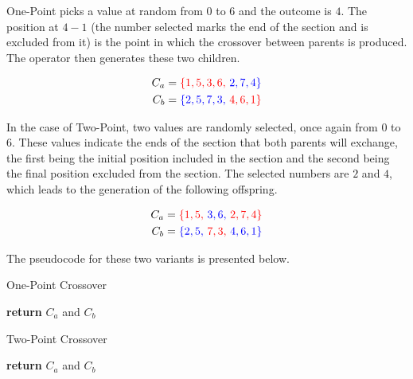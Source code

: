 One-Point picks a value at random from $0$ to $6$ and the outcome is $4$. The position at $4 - 1$ (the number selected marks the end of the section and is excluded from it) is the point in which the crossover between parents is produced. The operator then generates these two children.

\begin{align}
    C_{a} &= \color{red}{ \{ 1, 5, 3, 6,\ } \color{blue}{2, 7, 4} \}\\
    C_{b} &= \color{blue}{ \{ 2, 5, 7, 3,\ } \color{red}{4, 6, 1} \}
\end{align}

In the case of Two-Point, two values are randomly selected, once again from $0$ to $6$. These values indicate the ends of the section that both parents will exchange, the first being the initial position included in the section and the second being the final position excluded from the section. The selected numbers are $2$ and $4$, which leads to the generation of the following offspring.

\begin{align}
    C_{a} &= \color{red}{ \{ 1, 5,\ } \color{blue}{3, 6,\ } \color{red}{2, 7, 4} \}\\
    C_{b} &= \color{blue}{ \{ 2, 5,\ } \color{red}{7, 3,\ } \color{blue}{4, 6, 1} \}
\end{align}

The pseudocode for these two variants is presented below.

\begin{algorithm}[H]
    \caption{One-Point Crossover}
    \begin{algorithmic}[1]
                \EndFor
            \EndIf
            \State \textbf{return} {$C_{a}$ and $C_{b}$}
        \EndProcedure
    \end{algorithmic}
\end{algorithm}

\begin{algorithm}[H]
    \caption{Two-Point Crossover}
    \begin{algorithmic}[1]
            \EndIf
                \EndFor
            \EndIf
            \State \textbf{return} {$C_{a}$ and $C_{b}$}
        \EndProcedure
    \end{algorithmic}
\end{algorithm}

